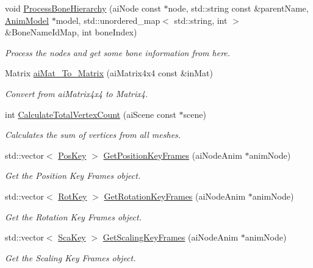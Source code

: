 \begin{DoxyCompactItemize}
void \hyperlink{namespaceFBXLoader_a0abc3a09454706533a9e071f04f8333f}{Process\+Bone\+Hierarchy} (ai\+Node const $\ast$node, std\+::string const  \&parent\+Name, \hyperlink{classAnimModel}{Anim\+Model} $\ast$model, std\+::unordered\+\_\+map$<$ std\+::string, int $>$ \&Bone\+Name\+Id\+Map, int bone\+Index)
\begin{DoxyCompactList}\small\item\em Process the nodes and get some bone information from here. \end{DoxyCompactList}\item 
Matrix \hyperlink{namespaceFBXLoader_adc013872047ea03643d9763d8c7a4afb}{ai\+Mat\+\_\+\+To\+\_\+\+Matrix} (ai\+Matrix4x4 const  \&in\+Mat)
\begin{DoxyCompactList}\small\item\em Convert from ai\+Matrix4x4 to Matrix4. \end{DoxyCompactList}\item 
int \hyperlink{namespaceFBXLoader_ac93d38d8445e4d743a879a0ffcaabef0}{Calculate\+Total\+Vertex\+Count} (ai\+Scene const $\ast$scene)
\begin{DoxyCompactList}\small\item\em Calculates the sum of vertices from all meshes. \end{DoxyCompactList}\item 
std\+::vector$<$ \hyperlink{structPosKey}{Pos\+Key} $>$ \hyperlink{namespaceFBXLoader_a8bb4d8d10bc2bda99438203d9ab68fe8}{Get\+Position\+Key\+Frames} (ai\+Node\+Anim $\ast$anim\+Node)
\begin{DoxyCompactList}\small\item\em Get the Position Key Frames object. \end{DoxyCompactList}\item 
std\+::vector$<$ \hyperlink{structRotKey}{Rot\+Key} $>$ \hyperlink{namespaceFBXLoader_ac2d362a5987d378985fc830901774b2f}{Get\+Rotation\+Key\+Frames} (ai\+Node\+Anim $\ast$anim\+Node)
\begin{DoxyCompactList}\small\item\em Get the Rotation Key Frames object. \end{DoxyCompactList}\item 
std\+::vector$<$ \hyperlink{structScaKey}{Sca\+Key} $>$ \hyperlink{namespaceFBXLoader_a09106d8a6aa754730867873b6cc1625f}{Get\+Scaling\+Key\+Frames} (ai\+Node\+Anim $\ast$anim\+Node)
\begin{DoxyCompactList}\small\item\em Get the Scaling Key Frames object. \end{DoxyCompactList}\end{DoxyCompactItemize}


